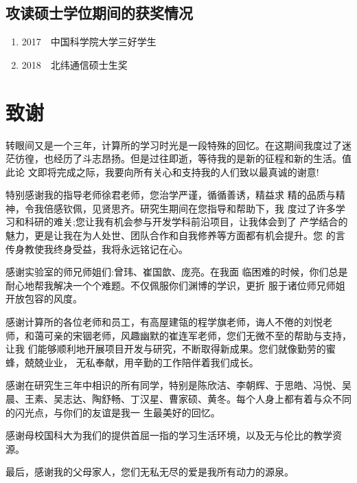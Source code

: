 \section*{攻读硕士学位期间的获奖情况} %
  \begin{enumerate}
\item 2017~~中国科学院大学三好学生 \label{[1]}
\item 2018~~北纬通信硕士生奖 \label{[2]}
  \end{enumerate}

\chapter[致谢]{致\quad 谢}%
\thispagestyle{noheaderstyle}%

转眼间又是一个三年，计算所的学习时光是一段特殊的回忆。在这期间我度过了迷 茫彷徨，也经历了斗志昂扬。但是过往即逝，等待我的是新的征程和新的生活。值此论 文即将完成之际，我要向所有关心和支持我的人们致以最真诚的谢意!

特别感谢我的指导老师徐君老师，您治学严谨，循循善诱，精益求 精的品质与精神，令我倍感钦佩，见贤思齐。研究生期间在您指导和帮助下，我 度过了许多学习和科研的难关;您让我有机会参与开发学科前沿项目，让我体会到了 产学结合的魅力，更是让我在为人处世、团队合作和自我修养等方面都有机会提升。您 的言传身教使我终身受益，我将永远铭记在心。

感谢实验室的师兄师姐们:曾玮、崔国歆、庞亮。在我面 临困难的时候，你们总是耐心地帮我解决一个个难题。不仅佩服你们渊博的学识，更折 服于诸位师兄师姐开放包容的风度。

感谢计算所的各位老师和员工，有高屋建瓴的程学旗老师，诲人不倦的刘悦老 师，和蔼可亲的宋铟老师，风趣幽默的崔连军老师，您们无微不至的帮助与支持，让我 们能够顺利地开展项目开发与研究，不断取得新成果。您们就像勤劳的蜜蜂，兢兢业业， 无私奉献，用辛勤的工作陪伴着我们成长。

感谢在研究生三年中相识的所有同学，特别是陈欣洁、李朝辉、于思皓、冯悦、吴晨、王素、吴志达、陶舒畅、丁汉星、曹家硕、黄冬。每个人身上都有着与众不同的闪光点，与你们的友谊是我一 生最美好的回忆。

感谢母校国科大为我们的提供首屈一指的学习生活环境，以及无与伦比的教学资源。

最后，感谢我的父母家人，您们无私无尽的爱是我所有动力的源泉。


\cleardoublepage[plain]%

